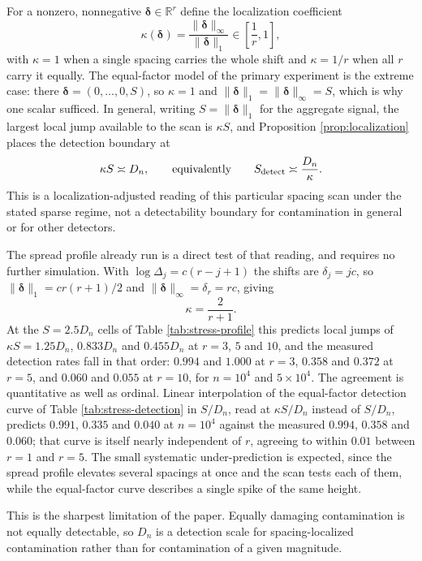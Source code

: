 \documentclass[11pt]{article}
\begin{document}
For a nonzero, nonnegative $\boldsymbol\delta\in\mathbb R^r$ define the
localization coefficient
\[
  \kappa(\boldsymbol\delta)
  =
  \frac{\|\boldsymbol\delta\|_\infty}{\|\boldsymbol\delta\|_1}
  \in\left[\frac1r,1\right],
\]
with $\kappa=1$ when a single spacing carries the whole shift and $\kappa=1/r$
when all $r$ carry it equally.  The equal-factor model of the primary
experiment is the extreme case: there $\boldsymbol\delta=(0,\ldots,0,S)$, so
$\kappa=1$ and $\|\boldsymbol\delta\|_1=\|\boldsymbol\delta\|_\infty=S$, which
is why one scalar sufficed.  In general, writing $S=\|\boldsymbol\delta\|_1$
for the aggregate signal, the largest local jump available to the scan is
$\kappa S$, and Proposition \ref{prop:localization} places the detection
boundary at
\[
  \kappa S\asymp D_n,
  \qquad\hbox{equivalently}\qquad
  S_{\mathrm{detect}}\asymp\frac{D_n}{\kappa}.
\]
This is a localization-adjusted reading of this particular spacing scan under
the stated sparse regime, not a detectability boundary for contamination in
general or for other detectors.

The spread profile already run is a direct test of that reading, and requires
no further simulation.  With $\log\Delta_j=c(r-j+1)$ the shifts are
$\delta_j=jc$, so $\|\boldsymbol\delta\|_1=cr(r+1)/2$ and
$\|\boldsymbol\delta\|_\infty=\delta_r=rc$, giving
\[
  \kappa=\frac2{r+1}.
\]
At the $S=2.5D_n$ cells of Table \ref{tab:stress-profile} this predicts local
jumps of $\kappa S=1.25D_n$, $0.833D_n$ and $0.455D_n$ at $r=3$, $5$ and $10$,
and the measured detection rates fall in that order: $0.994$ and $1.000$ at
$r=3$, $0.358$ and $0.372$ at $r=5$, and $0.060$ and $0.055$ at $r=10$, for
$n=10^4$ and $5\times10^4$.  The agreement is quantitative as well as ordinal.
Linear interpolation of the equal-factor detection curve of Table
\ref{tab:stress-detection} in $S/D_n$, read at $\kappa S/D_n$ instead of
$S/D_n$, predicts $0.991$, $0.335$ and $0.040$ at
$n=10^4$ against the measured $0.994$, $0.358$ and $0.060$; that curve is
itself nearly independent of $r$, agreeing to within $0.01$ between $r=1$ and
$r=5$.  The small systematic under-prediction is expected, since the spread
profile elevates several spacings at once and the scan tests each of them,
while the equal-factor curve describes a single spike of the same height.

This is the sharpest limitation of the paper.  Equally damaging contamination
is not equally detectable, so $D_n$ is a detection scale for spacing-localized
contamination rather than for contamination of a given magnitude.
\end{document}
